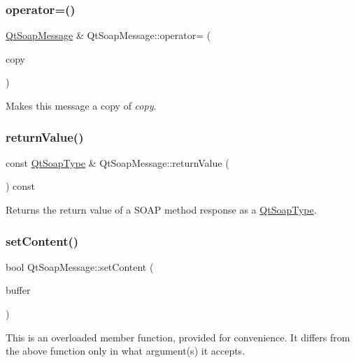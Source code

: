 \subsubsection{\texorpdfstring{operator=()}{operator=()}}
{\footnotesize\ttfamily \mbox{\hyperlink{class_qt_soap_message}{Qt\+Soap\+Message}} \& Qt\+Soap\+Message\+::operator= (\begin{DoxyParamCaption}\item[{const \mbox{\hyperlink{class_qt_soap_message}{Qt\+Soap\+Message}} \&}]{copy }\end{DoxyParamCaption})}

Makes this message a copy of {\itshape copy}. \mbox{\label{class_qt_soap_message_ac223f69e31d5f9ff251a467149c547d5}} 
\subsubsection{\texorpdfstring{return\+Value()}{returnValue()}}
{\footnotesize\ttfamily const \mbox{\hyperlink{class_qt_soap_type}{Qt\+Soap\+Type}} \& Qt\+Soap\+Message\+::return\+Value (\begin{DoxyParamCaption}{ }\end{DoxyParamCaption}) const}

Returns the return value of a S\+O\+AP method response as a \mbox{\hyperlink{class_qt_soap_type}{Qt\+Soap\+Type}}. \mbox{\label{class_qt_soap_message_a535e4eaf3d1c0372ec30e02e790b6b58}} 
\subsubsection{\texorpdfstring{set\+Content()}{setContent()}\hspace{0.1cm}{\footnotesize\ttfamily [1/2]}}
{\footnotesize\ttfamily bool Qt\+Soap\+Message\+::set\+Content (\begin{DoxyParamCaption}\item[{const Q\+Byte\+Array \&}]{buffer }\end{DoxyParamCaption})}

This is an overloaded member function, provided for convenience. It differs from the above function only in what argument(s) it accepts.

